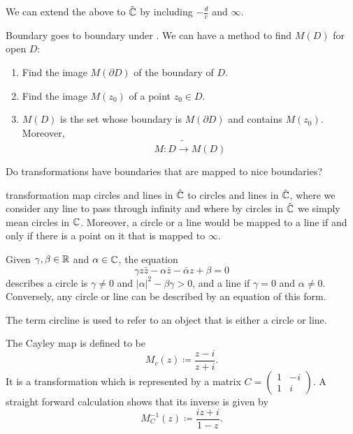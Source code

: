 \documentclass[10pt, a4paper]{article}
\begin{document}
\begin{remark}
    We can extend the above to $\hat{\mathbb{C}}$ by including $-\frac{d}{c}$ and $\infty$.
\end{remark}

Boundary goes to boundary under \mobius.
We can have a method to find $M(D)$ for open $D$:
\begin{enumerate}[label = (\arabic*)]
    \item Find the image $M(\partial D)$ of the boundary of $D$.

    \item Find the image $M(z_0)$ of a point $z_0 \in D$.

    \item $M(D)$ is the set whose boundary is $M(\partial D)$ and contains $M(z_0)$.
    Moreover,
    \[
    M : D \tilde{\to} M(D)
    \]
\end{enumerate}

Do \mobius transformations have boundaries that are mapped to nice boundaries?

\begin{proposition}
    \mobius transformation map circles and lines in $\hat{\mathbb{C}}$ to circles and lines in $\hat{\mathbb{C}}$,
    where we consider any line to pass through infinity and where by circles in $\hat{\mathbb{C}}$ we simply mean circles in $\mathbb{C}$.
    Moreover,
    a circle or a line would be mapped to a line if and only if there is a point on it that is mapped to $\infty$.
\end{proposition}

\begin{lemma}
    Given $\gamma, \beta \in \mathbb{R}$ and $\alpha \in \mathbb{C}$,
    the equation
    \[
    \gamma z\bar{z} - \alpha\bar{z} - \bar{\alpha}z + \beta = 0
    \]
    describes a circle is $\gamma \neq 0$ and $|\alpha| ^ 2 - \beta\gamma > 0$,
    and a line if $\gamma = 0$ and $\alpha \neq 0$.
    Conversely,
    any circle or line can be described by an equation of this form.
\end{lemma}

The term circline is used to refer to an object that is either a circle or line.

\begin{example}
    The Cayley map is defined to be
    \[
    M_c(z) \coloneqq \frac{z - i}{z + i}.
    \]
    It is a \mobius transformation which is represented by a matrix $C = \begin{pmatrix}
        1 & -i \\ 1 & i
    \end{pmatrix}$.
    A straight forward calculation shows that its inverse is given by
    \[
    M_{C} ^ {-1}(z) \coloneqq \frac{iz + i}{1 - z}.
    \]
\end{example}
\end{document}
